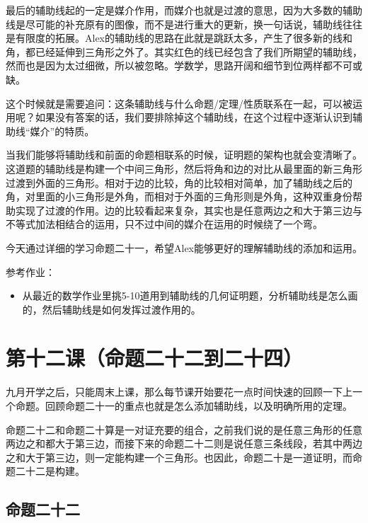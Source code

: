 \documentclass[
]{book}
\providecommand{\tightlist}{%
  \setlength{\itemsep}{0pt}\setlength{\parskip}{0pt}}
\begin{document}
最后的辅助线起的一定是媒介作用，而媒介也就是过渡的意思，因为大多数的辅助线是尽可能的补充原有的图像，而不是进行重大的更新，换一句话说，辅助线往往是有限度的拓展。Alex的辅助线的思路在此就是跳跃太多，产生了很多新的线和角，都已经延伸到三角形之外了。其实红色的线已经包含了我们所期望的辅助线，然而也是因为太过细微，所以被忽略。学数学，思路开阔和细节到位两样都不可或缺。

这个时候就是需要追问：这条辅助线与什么命题/定理/性质联系在一起，可以被运用呢？如果没有答案的话，我们要排除掉这个辅助线，在这个过程中逐渐认识到辅助线``媒介''的特质。

当我们能够将辅助线和前面的命题相联系的时候，证明题的架构也就会变清晰了。这道题的辅助线是构建一个中间三角形，然后将角和边的对比从最里面的新三角形过渡到外面的三角形。相对于边的比较，角的比较相对简单，加了辅助线之后的角，对里面的小三角形是外角，而相对于外面的三角形则是外角，这种双重身份帮助实现了过渡的作用。边的比较看起来复杂，其实也是任意两边之和大于第三边与不等式加法相结合的运用，只不过中间的媒介在运用的时候绕了一个弯。

今天通过详细的学习命题二十一，希望Alex能够更好的理解辅助线的添加和运用。

参考作业：

\begin{itemize}
\tightlist
\item
  从最近的数学作业里挑5-10道用到辅助线的几何证明题，分析辅助线是怎么画的，然后辅助线是如何发挥过渡作用的。
\end{itemize}

\hypertarget{ux7b2cux5341ux4e8cux8bfeux547dux9898ux4e8cux5341ux4e8cux5230ux4e8cux5341ux56db}{%
\chapter{第十二课（命题二十二到二十四）}\label{ux7b2cux5341ux4e8cux8bfeux547dux9898ux4e8cux5341ux4e8cux5230ux4e8cux5341ux56db}}

九月开学之后，只能周末上课，那么每节课开始要花一点时间快速的回顾一下上一个命题。回顾命题二十一的重点也就是怎么添加辅助线，以及明确所用的定理。

命题二十二和命题二十算是一对证充要的组合，之前我们说的是任意三角形的任意两边之和都大于第三边，而接下来的命题二十二则是说任意三条线段，若其中两边之和大于第三边，则一定能构建一个三角形。也因此，命题二十是一道证明，而命题二十二是构建。

\hypertarget{ux547dux9898ux4e8cux5341ux4e8c}{%
\section{命题二十二}\label{ux547dux9898ux4e8cux5341ux4e8c}}
\end{document}
